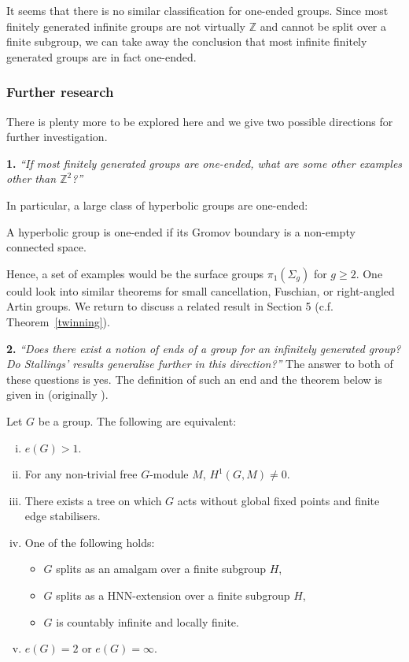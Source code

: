 It seems that there is no similar classification for one-ended groups. Since most finitely generated infinite groups are not virtually \(\mathbb{Z}\) and cannot be split over a finite subgroup, we can take away the conclusion that most infinite finitely generated groups are in fact one-ended.

\subsubsection{Further research}
There is plenty more to be explored here and we give two possible directions for further investigation. 

\textbf{1.} \textit{``If most finitely generated groups are one-ended, what are some other examples other than \(\mathbb{Z}^2\)?''} 

In particular, a large class of hyperbolic groups are one-ended:

\begin{theorem} \cite{S96}\label{wetotallyplannedthis}
    A hyperbolic group is one-ended if its Gromov boundary is a non-empty connected space.
\end{theorem}

Hence, a set of examples would be the surface groups \(\pi_1(\Sigma_g)\) for \(g \geq 2\). One could look into similar theorems for small cancellation, Fuschian, or right-angled Artin groups. We return to discuss a related result in Section 5 (c.f. Theorem~\ref{twinning}). 

\vspace{1em}
\textbf{2.} \textit{``Does there exist a notion of ends of a group for an infinitely generated group? Do Stallings' results generalise further in this direction?''}
The answer to both of these questions is yes. The definition of such an end and the theorem below is given in \cite{phdthesis} (originally \cite{D89}).

\begin{theorem}
     Let \(G\) be a group. The following are equivalent:
     \begin{enumerate}[(i)]
         \item \(e(G) > 1\).
         \item For any non-trivial free \(G\)-module \(M\), \(H^1(G,M) \neq 0\).
         \item There exists a tree on which \(G\) acts without global fixed points and finite edge stabilisers.
         \item One of the following holds:
         \begin{itemize}
             \item \(G\) splits as an amalgam over a finite subgroup \(H\),
             \item \(G\) splits as a HNN-extension over a finite subgroup \(H\),
             \item \(G\) is countably infinite and locally finite.
         \end{itemize}
         \item \(e(G) = 2\) or \(e(G) = \infty\).
     \end{enumerate}
\end{theorem}
